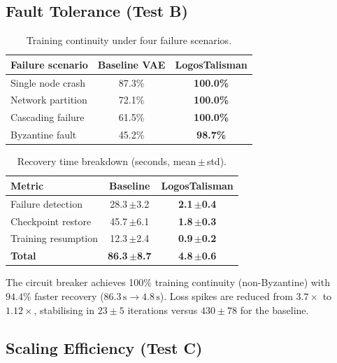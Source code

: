 \documentclass{article}
\begin{document}
\subsection{Fault Tolerance (Test B)}

\begin{table}[h]
\centering
\caption{Training continuity under four failure scenarios.}
\label{tab:continuity}
\begin{tabular}{@{}lcc@{}}
\toprule
Failure scenario      & Baseline VAE & LogosTalisman \\
\midrule
Single node crash     & 87.3\%   & \textbf{100.0\%} \\
Network partition     & 72.1\%   & \textbf{100.0\%} \\
Cascading failure     & 61.5\%   & \textbf{100.0\%} \\
Byzantine fault       & 45.2\%   & \textbf{98.7\%}  \\
\bottomrule
\end{tabular}
\end{table}

\begin{table}[h]
\centering
\caption{Recovery time breakdown (seconds, mean\,$\pm$\,std).}
\label{tab:recovery}
\begin{tabular}{@{}lcc@{}}
\toprule
Metric                & Baseline & LogosTalisman \\
\midrule
Failure detection     & 28.3\,{\footnotesize$\pm$3.2} & \textbf{2.1\,{\footnotesize$\pm$0.4}} \\
Checkpoint restore    & 45.7\,{\footnotesize$\pm$6.1} & \textbf{1.8\,{\footnotesize$\pm$0.3}} \\
Training resumption   & 12.3\,{\footnotesize$\pm$2.4} & \textbf{0.9\,{\footnotesize$\pm$0.2}} \\
\midrule
\textbf{Total}        & \textbf{86.3\,{\footnotesize$\pm$8.7}} & \textbf{4.8\,{\footnotesize$\pm$0.6}} \\
\bottomrule
\end{tabular}
\end{table}

The circuit breaker achieves 100\% training continuity (non-Byzantine)
with $94.4\%$ faster recovery ($86.3\,\mathrm{s} \to 4.8\,\mathrm{s}$).
Loss spikes are reduced from $3.7\times$ to $1.12\times$, stabilising in
$23{\pm}5$ iterations versus $430{\pm}78$ for the baseline.

\subsection{Scaling Efficiency (Test C)}
\end{document}
